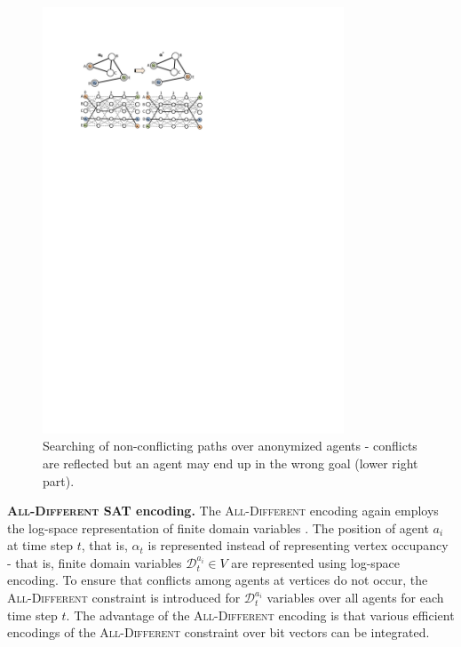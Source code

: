 \documentclass[jair,oneside,11pt]{article}
\begin{document}
\begin{figure}
\begin{center}
\includegraphics[trim={2.5cm 21cm 5.5cm 3cm},clip,width=0.8\textwidth]{fig_matching.pdf}
\end{center}
\caption{Searching of non-conflicting paths over anonymized agents - conflicts are reflected but an agent may end up in the wrong goal (lower right part).} \label{figure-matching}
\end{figure}

\textbf{\textsc{All-Different} SAT encoding.} The \textsc{All-Different} encoding again employs the log-space representation of finite domain variables \cite{DBLP:conf/ictai/Surynek12}. The position of agent $a_i$ at time step $t$, that is, $\alpha_t$ is represented instead of representing vertex occupancy - that is, finite domain variables $\mathcal{D}_t^{a_i} \in V$ are represented using log-space encoding. To ensure that conflicts among agents at vertices do not occur, the \textsc{All-Different} constraint \cite{DBLP:conf/aaai/Regin94} is introduced for $\mathcal{D}_t^{a_i}$ variables over all agents for each time step $t$. The advantage of the \textsc{All-Different} encoding is that various efficient encodings of the \textsc{All-Different} \cite{DBLP:conf/fmcad/BiereB08,DBLP:conf/ecai/Surynek12} constraint over bit vectors can be integrated.
\end{document}
